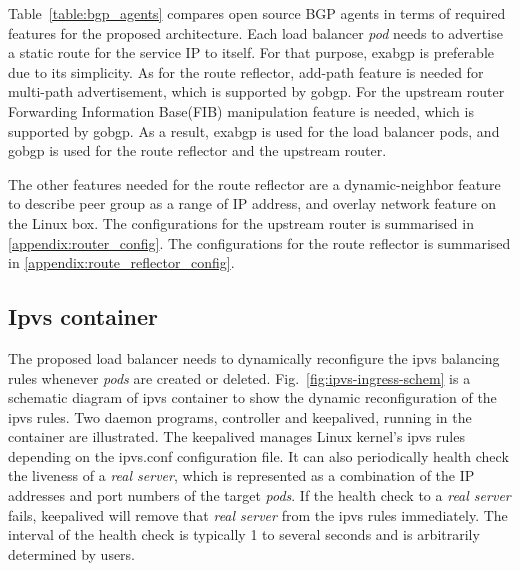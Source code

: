 Table~\ref{table:bgp_agents} compares open source BGP agents in terms of required features for the proposed architecture.
Each load balancer {\em pod} needs to advertise a static route for the service IP to itself. 
For that purpose, exabgp is preferable due to its simplicity.
As for the route reflector, add-path\cite{rfc7911} feature is needed for multi-path advertisement, which is supported by gobgp.
For the upstream router Forwarding Information Base(FIB) manipulation\cite{exa-networks_2018} feature is needed, which is supported by gobgp.
As a result, exabgp is used for the load balancer pods, and gobgp is used for the route reflector and the upstream router.

The other features needed for the route reflector are a dynamic-neighbor feature to describe peer group as a range of IP address, and overlay network feature on the Linux box.
The configurations for the upstream router is summarised in \ref{appendix:router_config}.
The configurations for the route reflector is summarised in \ref{appendix:route_reflector_config}.

\subsection{Ipvs container}\label{sec:ipvs}

The proposed load balancer needs to dynamically reconfigure the ipvs balancing rules whenever {\em pods} are created or deleted. 
Fig.~\ref{fig:ipvs-ingress-schem} is a schematic diagram of ipvs container to show the dynamic reconfiguration of the ipvs rules.
Two daemon programs, controller and keepalived, running in the container are illustrated.
The keepalived manages Linux kernel's ipvs rules depending on the ipvs.conf configuration file.
It can also periodically health check the liveness of a {\em real server}, 
which is represented as a combination of the IP addresses and port numbers of the target {\em pods}. 
If the health check to a {\em real server} fails, keepalived will remove that {\em real server} from the ipvs rules immediately.
The interval of the health check is typically 1 to several seconds and is arbitrarily determined by users.  

